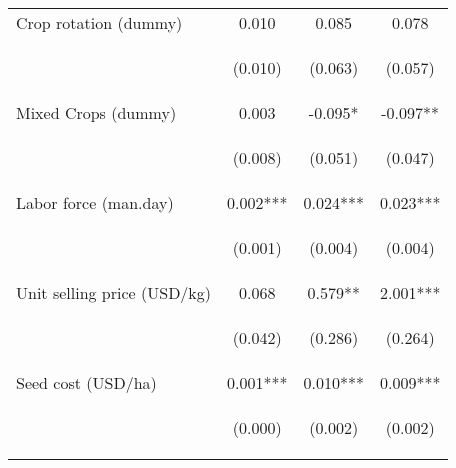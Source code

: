 \begin{center}
\begin{tabular}{lccc}
Crop rotation (dummy) & 0.010 & 0.085 & 0.078 \\
\vspace{4pt} & \begin{footnotesize}(0.010)\end{footnotesize} & \begin{footnotesize}(0.063)\end{footnotesize} & \begin{footnotesize}(0.057)\end{footnotesize} \\
Mixed Crops (dummy) & 0.003 & -0.095* & -0.097** \\
\vspace{4pt} & \begin{footnotesize}(0.008)\end{footnotesize} & \begin{footnotesize}(0.051)\end{footnotesize} & \begin{footnotesize}(0.047)\end{footnotesize} \\
Labor force (man.day) & 0.002*** & 0.024*** & 0.023*** \\
\vspace{4pt} & \begin{footnotesize}(0.001)\end{footnotesize} & \begin{footnotesize}(0.004)\end{footnotesize} & \begin{footnotesize}(0.004)\end{footnotesize} \\
Unit selling price (USD/kg) & 0.068 & 0.579** & 2.001*** \\
\vspace{4pt} & \begin{footnotesize}(0.042)\end{footnotesize} & \begin{footnotesize}(0.286)\end{footnotesize} & \begin{footnotesize}(0.264)\end{footnotesize} \\
Seed cost (USD/ha) & 0.001*** & 0.010*** & 0.009*** \\
\vspace{4pt} & \begin{footnotesize}(0.000)\end{footnotesize} & \begin{footnotesize}(0.002)\end{footnotesize} & \begin{footnotesize}(0.002)\end{footnotesize} \\

\end{tabular}
\end{center}
